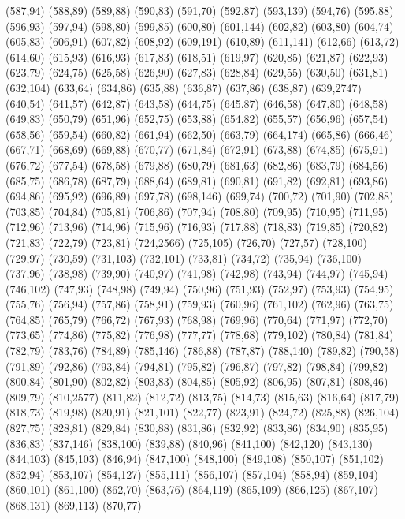 (587,94)
(588,89)
(589,88)
(590,83)
(591,70)
(592,87)
(593,139)
(594,76)
(595,88)
(596,93)
(597,94)
(598,80)
(599,85)
(600,80)
(601,144)
(602,82)
(603,80)
(604,74)
(605,83)
(606,91)
(607,82)
(608,92)
(609,191)
(610,89)
(611,141)
(612,66)
(613,72)
(614,60)
(615,93)
(616,93)
(617,83)
(618,51)
(619,97)
(620,85)
(621,87)
(622,93)
(623,79)
(624,75)
(625,58)
(626,90)
(627,83)
(628,84)
(629,55)
(630,50)
(631,81)
(632,104)
(633,64)
(634,86)
(635,88)
(636,87)
(637,86)
(638,87)
(639,2747)
(640,54)
(641,57)
(642,87)
(643,58)
(644,75)
(645,87)
(646,58)
(647,80)
(648,58)
(649,83)
(650,79)
(651,96)
(652,75)
(653,88)
(654,82)
(655,57)
(656,96)
(657,54)
(658,56)
(659,54)
(660,82)
(661,94)
(662,50)
(663,79)
(664,174)
(665,86)
(666,46)
(667,71)
(668,69)
(669,88)
(670,77)
(671,84)
(672,91)
(673,88)
(674,85)
(675,91)
(676,72)
(677,54)
(678,58)
(679,88)
(680,79)
(681,63)
(682,86)
(683,79)
(684,56)
(685,75)
(686,78)
(687,79)
(688,64)
(689,81)
(690,81)
(691,82)
(692,81)
(693,86)
(694,86)
(695,92)
(696,89)
(697,78)
(698,146)
(699,74)
(700,72)
(701,90)
(702,88)
(703,85)
(704,84)
(705,81)
(706,86)
(707,94)
(708,80)
(709,95)
(710,95)
(711,95)
(712,96)
(713,96)
(714,96)
(715,96)
(716,93)
(717,88)
(718,83)
(719,85)
(720,82)
(721,83)
(722,79)
(723,81)
(724,2566)
(725,105)
(726,70)
(727,57)
(728,100)
(729,97)
(730,59)
(731,103)
(732,101)
(733,81)
(734,72)
(735,94)
(736,100)
(737,96)
(738,98)
(739,90)
(740,97)
(741,98)
(742,98)
(743,94)
(744,97)
(745,94)
(746,102)
(747,93)
(748,98)
(749,94)
(750,96)
(751,93)
(752,97)
(753,93)
(754,95)
(755,76)
(756,94)
(757,86)
(758,91)
(759,93)
(760,96)
(761,102)
(762,96)
(763,75)
(764,85)
(765,79)
(766,72)
(767,93)
(768,98)
(769,96)
(770,64)
(771,97)
(772,70)
(773,65)
(774,86)
(775,82)
(776,98)
(777,77)
(778,68)
(779,102)
(780,84)
(781,84)
(782,79)
(783,76)
(784,89)
(785,146)
(786,88)
(787,87)
(788,140)
(789,82)
(790,58)
(791,89)
(792,86)
(793,84)
(794,81)
(795,82)
(796,87)
(797,82)
(798,84)
(799,82)
(800,84)
(801,90)
(802,82)
(803,83)
(804,85)
(805,92)
(806,95)
(807,81)
(808,46)
(809,79)
(810,2577)
(811,82)
(812,72)
(813,75)
(814,73)
(815,63)
(816,64)
(817,79)
(818,73)
(819,98)
(820,91)
(821,101)
(822,77)
(823,91)
(824,72)
(825,88)
(826,104)
(827,75)
(828,81)
(829,84)
(830,88)
(831,86)
(832,92)
(833,86)
(834,90)
(835,95)
(836,83)
(837,146)
(838,100)
(839,88)
(840,96)
(841,100)
(842,120)
(843,130)
(844,103)
(845,103)
(846,94)
(847,100)
(848,100)
(849,108)
(850,107)
(851,102)
(852,94)
(853,107)
(854,127)
(855,111)
(856,107)
(857,104)
(858,94)
(859,104)
(860,101)
(861,100)
(862,70)
(863,76)
(864,119)
(865,109)
(866,125)
(867,107)
(868,131)
(869,113)
(870,77)
